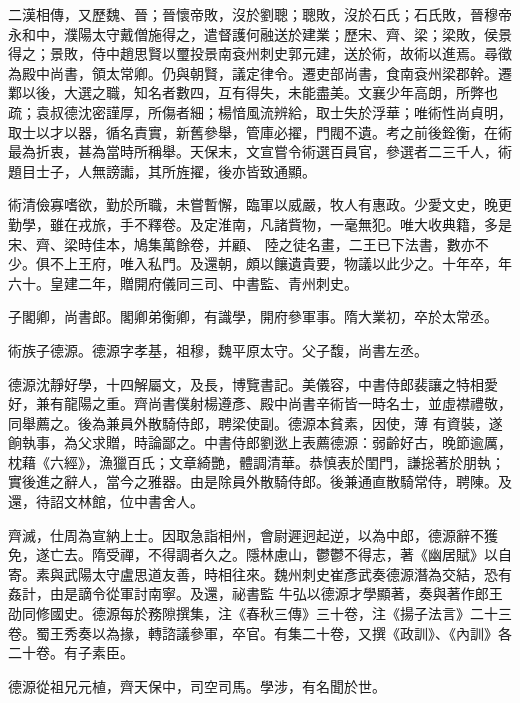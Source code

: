 \begin{pinyinscope}
 二漢相傳，又歷魏、晉；晉懷帝敗，沒於劉聰；聰敗，沒於石氏；石氏敗，晉穆帝永和中，濮陽太守戴僧施得之，遣督護何融送於建業；歷宋、齊、梁；梁敗，侯景得之；景敗，侍中趙思賢以璽投景南袞州刺史郭元建，送於術，故術以進焉。尋徵為殿中尚書，領太常卿。仍與朝賢，議定律令。遷吏部尚書，食南袞州梁郡幹。遷
 鄴以後，大選之職，知名者數四，互有得失，未能盡美。文襄少年高朗，所弊也疏；袁叔德沈密謹厚，所傷者細；楊愔風流辨給，取士失於浮華；唯術性尚貞明，取士以才以器，循名責實，新舊參舉，管庫必擢，門閥不遺。考之前後銓衡，在術最為折衷，甚為當時所稱舉。天保末，文宣嘗令術選百員官，參選者二三千人，術題目士子，人無謗讟，其所旌擢，後亦皆致通顯。



 術清儉寡嗜欲，勤於所職，未嘗暫懈，臨軍以威嚴，牧人有惠政。少愛文史，晚更勤學，雖在戎旅，手不釋卷。及定淮南，凡諸貲物，一毫無犯。唯大收典籍，多是宋、齊、梁時佳本，鳩集萬餘卷，并顧、
 陸之徒名畫，二王已下法書，數亦不少。俱不上王府，唯入私門。及還朝，頗以饟遺貴要，物議以此少之。十年卒，年六十。皇建二年，贈開府儀同三司、中書監、青州刺史。



 子閣卿，尚書郎。閣卿弟衡卿，有識學，開府參軍事。隋大業初，卒於太常丞。



 術族子德源。德源字孝基，祖穆，魏平原太守。父子馥，尚書左丞。



 德源沈靜好學，十四解屬文，及長，博覽書記。美儀容，中書侍郎裴讓之特相愛好，兼有龍陽之重。齊尚書僕射楊遵彥、殿中尚書辛術皆一時名士，並虛襟禮敬，同舉薦之。後為兼員外散騎侍郎，聘梁使副。德源本貧素，因使，薄
 有資裝，遂餉執事，為父求贈，時論鄙之。中書侍郎劉逖上表薦德源：弱齡好古，晚節逾厲，枕藉《六經》，漁獵百氏；文章綺艷，體調清華。恭慎表於閨門，謙捴著於朋執；實後進之辭人，當今之雅器。由是除員外散騎侍郎。後兼通直散騎常侍，聘陳。及還，待詔文林館，位中書舍人。



 齊滅，仕周為宣納上士。因取急詣相州，會尉遲迥起逆，以為中郎，德源辭不獲免，遂亡去。隋受禪，不得調者久之。隱林慮山，鬱鬱不得志，著《幽居賦》以自寄。素與武陽太守盧思道友善，時相往來。魏州刺史崔彥武奏德源潛為交結，恐有姦計，由是謫令從軍討南寧。及還，祕書監
 牛弘以德源才學顯著，奏與著作郎王劭同修國史。德源每於務隙撰集，注《春秋三傳》三十卷，注《揚子法言》二十三卷。蜀王秀奏以為掾，轉諮議參軍，卒官。有集二十卷，又撰《政訓》、《內訓》各二十卷。有子素臣。



 德源從祖兄元植，齊天保中，司空司馬。學涉，有名聞於世。




\end{pinyinscope}
